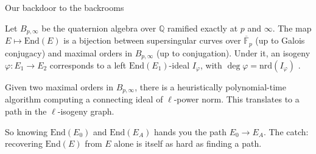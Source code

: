 \documentclass[10pt,aspectratio=169]{beamer}
\begin{document}
\begin{frame}{Our backdoor to the backrooms}
  \begin{theorem}
    Let $B_{p,\infty}$ be the quaternion algebra over $\mathbb{Q}$ ramified exactly at $p$ and $\infty$.
    The map $E \mapsto \text{End}(E)$ is a bijection between supersingular curves over
    $\overline{\mathbb{F}}_p$ (up to Galois conjugacy) and maximal orders in $B_{p,\infty}$ (up to
    conjugation). Under it, an isogeny $\varphi: E_1 \to E_2$ corresponds to a left
    $\text{End}(E_1)$-ideal $I_\varphi$, with $\deg\varphi = \text{nrd}(I_\varphi)$ \cite[Ch.~42]{voight}.
  \end{theorem}
  \vspace{0.5em}
  \begin{theorem}
    Given two maximal orders in $B_{p,\infty}$, there is a heuristically polynomial-time algorithm
    computing a connecting ideal of $\ell$-power norm. This translates to a \alert{path} in the $\ell$-isogeny graph.
  \end{theorem}
  So knowing $\text{End}(E_0)$ and $\text{End}(E_A)$ hands you the path $E_0 \to E_A$. The catch: recovering
  $\text{End}(E)$ from $E$ alone is itself as hard as finding a path.
\end{frame}
\end{document}
